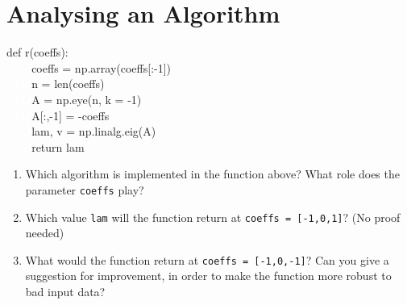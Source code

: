 \section{Analysing an Algorithm}
def r(coeffs):\\
\textcolor{white}{dddd}coeffs = np.array(coeffs[:-1])\\
\textcolor{white}{dddd}n = len(coeffs)\\
\textcolor{white}{dddd}A = np.eye(n, k = -1)\\
\textcolor{white}{dddd}A[:,-1] = -coeffs\\
\textcolor{white}{dddd}lam, v = np.linalg.eig(A)\\
\textcolor{white}{dddd}return lam\\
\begin{enumerate}
	\item Which algorithm is implemented in the function above? What role does the parameter \verb|coeffs| play?
	\item Which value \verb|lam| will the function return at \verb|coeffs = [-1,0,1]|? (No proof needed)
	\item What would the function return at \verb|coeffs = [-1,0,-1]|? Can you give a suggestion for improvement, in order to make
	the function more robust to bad input data? 
\end{enumerate}